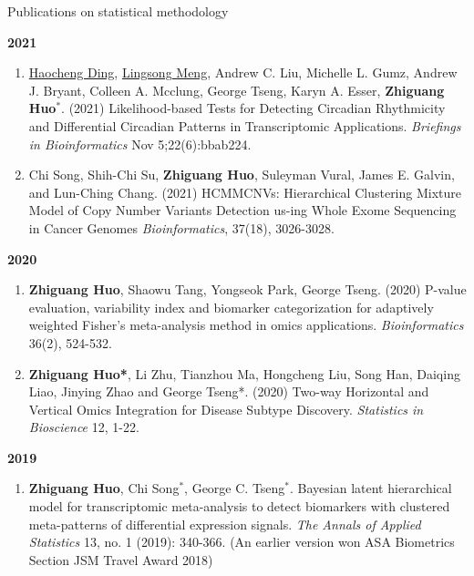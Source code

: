 \documentclass{resume} %
\begin{document}
\begin{rSection}{Publications on statistical methodology}
\begin{enumerate}[noitemsep,topsep=0pt, resume]
\end{enumerate}


\textbf{2021}
\begin{enumerate}[noitemsep,topsep=0pt, resume]

\item
\underline{Haocheng Ding}, \underline{Lingsong Meng}, Andrew C. Liu, Michelle L. Gumz, Andrew J. Bryant, Colleen A. Mcclung, George Tseng, Karyn A. Esser, {\bf Zhiguang Huo}$^*$.  (2021)
Likelihood-based Tests for Detecting Circadian Rhythmicity and Differential Circadian Patterns in Transcriptomic Applications. 
\emph{Briefings in Bioinformatics} Nov 5;22(6):bbab224.

\item  
Chi Song, Shih-Chi Su, {\bf Zhiguang Huo}, Suleyman Vural, James E. Galvin, and Lun-Ching Chang. (2021) 
HCMMCNVs: Hierarchical Clustering Mixture Model of Copy Number Variants Detection us-ing Whole Exome Sequencing in Cancer Genomes
\emph{Bioinformatics}, 37(18), 3026-3028.

\end{enumerate}

\textbf{2020}
\begin{enumerate}[noitemsep,topsep=0pt, resume]

\item  {\bf  Zhiguang Huo}, Shaowu Tang, Yongseok Park, George Tseng. (2020) 
P-value evaluation, variability index and biomarker categorization for adaptively weighted Fisher's meta-analysis method in omics applications. 
\emph{Bioinformatics} 36(2), 524-532.

\item {\bf  Zhiguang Huo*}, Li Zhu, Tianzhou Ma, Hongcheng Liu, Song Han, Daiqing Liao, Jinying Zhao and George Tseng*.  (2020)
Two-way Horizontal and Vertical Omics Integration for Disease Subtype Discovery. \emph{Statistics in Bioscience} 12, 1-22.

\end{enumerate}

\textbf{2019}
\begin{enumerate}[noitemsep,topsep=0pt,resume]

\item 
{\bf Zhiguang Huo}, Chi Song$^*$, George C. Tseng$^*$. 
Bayesian latent hierarchical model for transcriptomic meta-analysis to detect biomarkers with clustered meta-patterns of differential expression signals. \emph{The Annals of Applied Statistics} 13, no. 1 (2019): 340-366. (An earlier version won ASA Biometrics Section JSM Travel Award 2018)


\end{enumerate}
\end{rSection}
\end{document}
